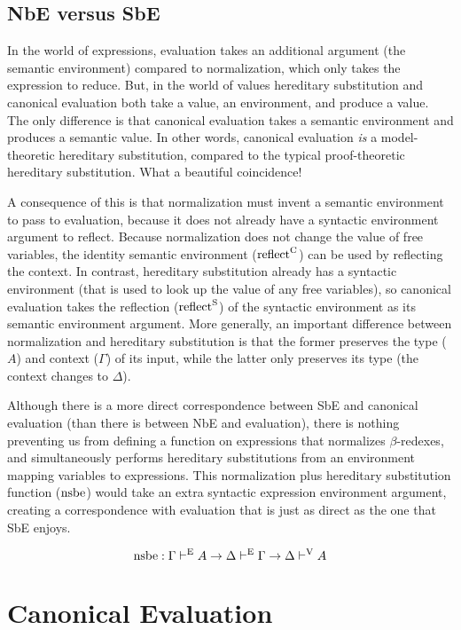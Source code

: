 \documentclass{llncs}
\def\marr{\rightarrow}
\def\reflecte{\fun{reflect}^\con{S}}
\def\reflectc{\fun{reflect}^\con{C}}
\def\nsbe{\fun{nsbe}}
\newcommand{\turn}[1]{\vdash^\con{#1}}
\newcommand{\con}[1]{\textmd{#1}}
\newcommand{\fun}[1]{\textmd{#1}}
\newcommand{\type}[1]{\Gamma \turn{E} #1}
\newcommand{\dtypv}[1]{\Delta \turn{V} #1}
\def\enve{\Delta \turn{E} \Gamma}
\begin{document}
\subsection{NbE versus SbE}

In the world of expressions,
evaluation takes an additional argument (the semantic environment) compared
to normalization, which only takes the expression to reduce. But, in
the world of values hereditary substitution and canonical evaluation
both take a value, an environment, and produce a value. The only
difference is that canonical evaluation takes a semantic environment and
produces a semantic value. 
In other words, canonical evaluation \textit{is}
a model-theoretic hereditary substitution, compared to the typical
proof-theoretic hereditary substitution.
What a beautiful coincidence!

A consequence of this is that normalization must invent a semantic
environment to pass to evaluation, because it does not already
have a syntactic environment argument to reflect. Because normalization does not
change the value of free variables, the identity semantic environment
($\reflectc$) can be used by reflecting the context. In contrast, hereditary substitution already has
a syntactic environment (that is used to look up the value of any free
variables), so canonical evaluation takes the 
reflection ($\reflecte$) of the syntactic environment as its semantic
environment argument. More generally, an important difference between
normalization and hereditary substitution is that the former preserves
the type ($A$) and context ($\Gamma$) of its input, while the latter
only preserves its type (the context changes to $\Delta$).

Although there is a more direct correspondence between SbE and canonical
evaluation (than there is between NbE and evaluation), there is
nothing preventing us from defining a function on expressions that
normalizes $\beta$-redexes, and simultaneously performs hereditary
substitutions from an environment mapping variables to expressions.
This normalization plus hereditary substitution function ($\nsbe$) would take an
extra syntactic expression environment argument, creating a
correspondence with evaluation that is just as direct as the one that
SbE enjoys.

$$
\nsbe : \type{A} \marr \enve \marr \dtypv{A}
$$


\section{Canonical Evaluation}
\label{sec:ceval}
\end{document}
